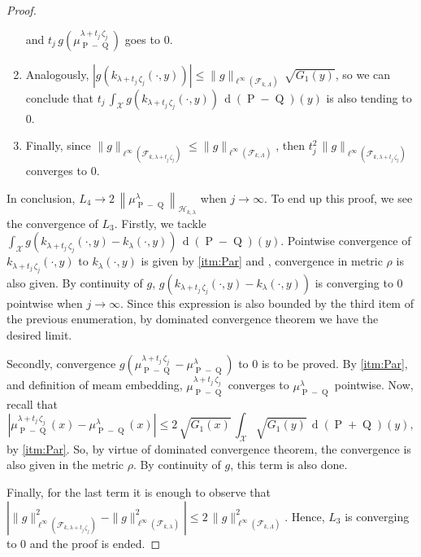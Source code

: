 \begin{proof}
\begin{enumerate}
\begin{equation}
					\end{equation}
					and $t_{j}\,g\left(\mu_{\operatorname{P}-\operatorname{Q}}^{\lambda+t_{j}\,\zeta_{j}}\right)$ goes to $0$.
					\item Analogously, $\left|g\left(k_{\lambda+t_{j}\,\zeta_{j}}(\cdot,y)\right)\right|\leq\|g\|_{\ell^{\infty}\left(\mathcal{F}_{k,\Lambda}\right)}\,\sqrt{G_{1}(y)}$, so we can conclude that $\displaystyle t_{j}\,\int_{\mathcal{X}}g\left(k_{\lambda+t_{j}\,\zeta_{j}}(\cdot,y)\right)\,\operatorname{d}(\operatorname{P}-\operatorname{Q})(y)$ is also tending to $0$.
					\item Finally, since $\|g\|_{\ell^{\infty}\left(\mathcal{F}_{k,\lambda+t_{j}\,\zeta_{j}}\right)}\leq\|g\|_{\ell^{\infty}\left(\mathcal{F}_{k,\Lambda}\right)}$, then $t_{j}^{2}\,\|g\|_{\ell^{\infty}\left(\mathcal{F}_{k,\lambda+t_{j}\,\zeta_{j}}\right)}$ converges to $0$.
				\end{enumerate}
				In conclusion, $L_{4}\longrightarrow2\,\left\|\mu_{\operatorname{P}-\operatorname{Q}}^{\lambda}\right\|_{\mathcal{H}_{k,\lambda}}$ when $j\longrightarrow\infty$. To end up this proof, we see the convergence of $L_{3}$. Firstly, we tackle $\displaystyle\int_{\mathcal{X}}g\left(k_{\lambda+t_{j}\,\zeta_{j}}(\cdot,y)-k_{\lambda}(\cdot,y)\right)\,\operatorname{d}(\operatorname{P}-\operatorname{Q})(y)$. Pointwise convergence of $k_{\lambda+t_{j}\,\zeta_{j}}(\cdot,y)$ to $k_{\lambda}(\cdot,y)$ is given by \ref{itm:Par} and \textcite[Theorem 2.27]{Folland2013}, convergence in metric $\rho$ is also given. By continuity of $g$, $g\left(k_{\lambda+t_{j}\,\zeta_{j}}(\cdot,y)-k_{\lambda}(\cdot,y)\right)$ is converging to $0$ pointwise when $j\longrightarrow\infty$. Since this expression is also bounded by the third item of the previous enumeration, by dominated convergence theorem we have the desired limit.
				
				Secondly, convergence $g\left(\mu_{\operatorname{P}-\operatorname{Q}}^{\lambda+t_{j}\,\zeta_{j}}-\mu_{\operatorname{P}-\operatorname{Q}}^{\lambda}\right)$ to $0$ is to be proved. By \ref{itm:Par}, and definition of meam embedding, $\mu_{\operatorname{P}-\operatorname{Q}}^{\lambda+t_{j}\,\zeta_{j}}$ converges to $\mu_{\operatorname{P}-\operatorname{Q}}^{\lambda}$ pointwise. Now, recall that
				\begin{equation}
					\left|\mu_{\operatorname{P}-\operatorname{Q}}^{\lambda+t_{j}\,\zeta_{j}}(x)-\mu_{\operatorname{P}-\operatorname{Q}}^{\lambda}(x)\right|\leq2\,\sqrt{G_{1}(x)}\,\int_{\mathcal{X}}\sqrt{G_{1}(y)}\,\operatorname{d}(\operatorname{P}+\operatorname{Q})(y),
				\end{equation}
				by \ref{itm:Par}. So, by virtue of dominated convergence theorem, the convergence is also given in the metric $\rho$. By continuity of $g$, this term is also done.
				
				Finally, for the last term it is enough to observe that $\left|\|g\|_{\ell^{\infty}\left(\mathcal{F}_{k,\lambda+t_{j}\,\zeta_{j}}\right)}^{2}-\|g\|_{\ell^{\infty}\left(\mathcal{F}_{k,\lambda}\right)}^{2}\right|\leq2\,\|g\|_{\ell^{\infty}\left(\mathcal{F}_{k,\Lambda}\right)}^{2}$. Hence, $L_{3}$ is converging to $0$ and the proof is ended.
			\end{proof}
